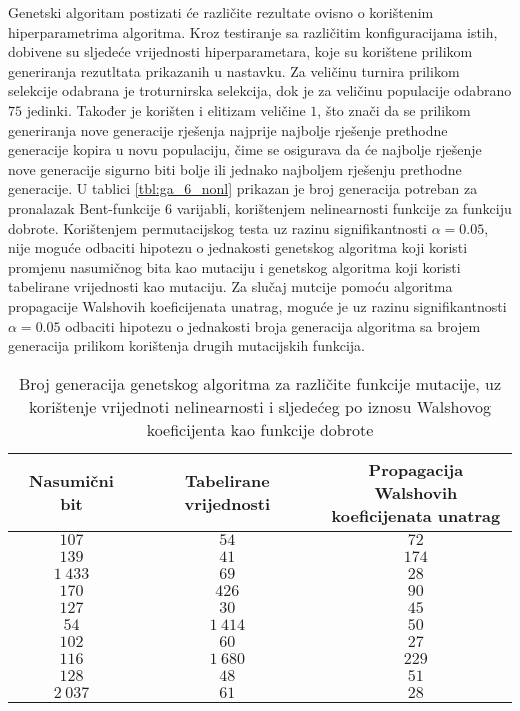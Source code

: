Genetski algoritam postizati će različite rezultate ovisno o korištenim hiperparametrima algoritma.
Kroz testiranje sa različitim konfiguracijama istih, dobivene su sljedeće vrijednosti hiperparametara, koje su korištene prilikom generiranja rezutltata prikazanih u nastavku.
Za veličinu turnira prilikom selekcije odabrana je troturnirska selekcija, dok je za veličinu populacije odabrano $75$ jedinki.
Također je korišten i elitizam veličine $1$, što znači da se prilikom generiranja nove generacije rješenja najprije najbolje rješenje prethodne generacije kopira u novu populaciju, čime se osigurava da će najbolje rješenje nove generacije sigurno biti bolje ili jednako najboljem rješenju prethodne generacije.
U tablici \ref{tbl:ga_6_nonl} prikazan je broj generacija potreban za pronalazak Bent-funkcije $6$ varijabli, korištenjem nelinearnosti funkcije za funkciju dobrote.
Korištenjem permutacijskog testa uz razinu signifikantnosti $\alpha = 0.05$, nije moguće odbaciti hipotezu o jednakosti genetskog algoritma koji koristi promjenu nasumičnog bita kao mutaciju i genetskog algoritma koji koristi tabelirane vrijednosti kao mutaciju.
Za slučaj mutcije pomoću algoritma propagacije Walshovih koeficijenata unatrag, moguće je uz razinu signifikantnosti $\alpha = 0.05$ odbaciti hipotezu o jednakosti broja generacija algoritma sa brojem generacija prilikom korištenja drugih mutacijskih funkcija.

\begin{table}[]
    \centering
    \begin{tabular}{ccc}
        Nasumični bit & Tabelirane vrijednosti & \makecell{Propagacija Walshovih \\ koeficijenata unatrag} \\ \hline
           $107$ &     $54$ &  $72$ \\
           $139$ &     $41$ & $174$ \\
        $1\:433$ &     $69$ &  $28$ \\
           $170$ &    $426$ &  $90$ \\
           $127$ &     $30$ &  $45$ \\
            $54$ & $1\:414$ &  $50$ \\
           $102$ &     $60$ &  $27$ \\
           $116$ & $1\:680$ & $229$ \\
           $128$ &     $48$ &  $51$ \\
        $2\:037$ &     $61$ &  $28$
    \end{tabular}
    \captionsetup{justification=centering}
    \caption{Broj generacija genetskog algoritma za različite funkcije mutacije, uz korištenje vrijednoti nelinearnosti i sljedećeg po iznosu Walshovog koeficijenta kao funkcije dobrote}
    \label{tbl:ga_6_nonlV2}
\end{table}


